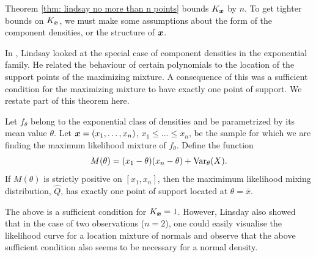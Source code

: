 	Theorem \ref{thm: lindsay no more than n points} bounds $K_{\bm{{x}}}$ by $n$. To get tighter bounds on $K_{\bm{{x}}}$, we must make some assumptions about the form of the component densities, or the structure of ${\bm{{x}}}$.

	In \cite{Lindsay1983a-he}, Lindsay looked at the special case of  component densities in the exponential family. He related the behaviour of certain polynomials to the location of the support points of the maximizing mixture. A consequence of this was a sufficient condition for the maximizing mixture to have exactly one point of support. We restate part of this theorem here.

	\begin{theorem}
	\label{thm:exponential family k=1 bound}
		Let $f_\theta$ belong to the exponential class of densities and be parametrized by its mean value $\theta$. Let ${\bm{{x}}} = (x_1, \dots, x_n)$, $x_1 \leq \dots \leq x_n$, be the sample for which we are finding the maximum likelihood mixture of $f_\theta$. Define the function
		\begin{equation}
			M(\theta) = (x_1 - \theta)(x_n - \theta) + \mathrm{Var}_\theta(X).
		\end{equation}
		If $M(\theta)$ is strictly positive on $[x_1, x_n]$, then the maximimum likelihood mixing distribution, $\hat{Q}$, has exactly one point of support located at $\theta = \bar{x}$.
	\end{theorem}

	The above is a sufficient condition for $K_{\bm{{x}}} = 1$. However, Linsday also showed that in the case of two observations ($n=2$), one could easily visualise the likelihood curve for a location mixture of normals and observe that the above sufficient condition also seems to be necessary for a normal density. 

